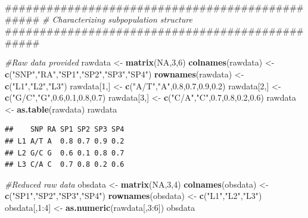 \documentclass[]{article}
\newenvironment{Shaded}{\begin{snugshade}}{\end{snugshade}}
\newcommand{\KeywordTok}[1]{\textcolor[rgb]{0.13,0.29,0.53}{\textbf{{#1}}}}
\newcommand{\DecValTok}[1]{\textcolor[rgb]{0.00,0.00,0.81}{{#1}}}
\newcommand{\FloatTok}[1]{\textcolor[rgb]{0.00,0.00,0.81}{{#1}}}
\newcommand{\StringTok}[1]{\textcolor[rgb]{0.31,0.60,0.02}{{#1}}}
\newcommand{\CommentTok}[1]{\textcolor[rgb]{0.56,0.35,0.01}{\textit{{#1}}}}
\newcommand{\OtherTok}[1]{\textcolor[rgb]{0.56,0.35,0.01}{{#1}}}
\newcommand{\NormalTok}[1]{{#1}}
\begin{document}
\begin{Shaded}
\begin{Highlighting}[]
\NormalTok{################################################}
\CommentTok{# Characterizing subpopulation structure}
\NormalTok{################################################}

\CommentTok{#Raw data provided}
\NormalTok{rawdata <-}\StringTok{ }\KeywordTok{matrix}\NormalTok{(}\OtherTok{NA}\NormalTok{,}\DecValTok{3}\NormalTok{,}\DecValTok{6}\NormalTok{)}
\KeywordTok{colnames}\NormalTok{(rawdata) <-}\StringTok{ }\KeywordTok{c}\NormalTok{(}\StringTok{"SNP"}\NormalTok{,}\StringTok{"RA"}\NormalTok{,}\StringTok{"SP1"}\NormalTok{,}\StringTok{"SP2"}\NormalTok{,}\StringTok{"SP3"}\NormalTok{,}\StringTok{"SP4"}\NormalTok{)}
\KeywordTok{rownames}\NormalTok{(rawdata) <-}\StringTok{ }\KeywordTok{c}\NormalTok{(}\StringTok{"L1"}\NormalTok{,}\StringTok{"L2"}\NormalTok{,}\StringTok{"L3"}\NormalTok{)}
\NormalTok{rawdata[}\DecValTok{1}\NormalTok{,] <-}\StringTok{ }\KeywordTok{c}\NormalTok{(}\StringTok{"A/T"}\NormalTok{,}\StringTok{"A"}\NormalTok{,}\FloatTok{0.8}\NormalTok{,}\FloatTok{0.7}\NormalTok{,}\FloatTok{0.9}\NormalTok{,}\FloatTok{0.2}\NormalTok{)}
\NormalTok{rawdata[}\DecValTok{2}\NormalTok{,] <-}\StringTok{ }\KeywordTok{c}\NormalTok{(}\StringTok{"G/C"}\NormalTok{,}\StringTok{"G"}\NormalTok{,}\FloatTok{0.6}\NormalTok{,}\FloatTok{0.1}\NormalTok{,}\FloatTok{0.8}\NormalTok{,}\FloatTok{0.7}\NormalTok{)}
\NormalTok{rawdata[}\DecValTok{3}\NormalTok{,] <-}\StringTok{ }\KeywordTok{c}\NormalTok{(}\StringTok{"C/A"}\NormalTok{,}\StringTok{"C"}\NormalTok{,}\FloatTok{0.7}\NormalTok{,}\FloatTok{0.8}\NormalTok{,}\FloatTok{0.2}\NormalTok{,}\FloatTok{0.6}\NormalTok{)}
\NormalTok{rawdata <-}\StringTok{ }\KeywordTok{as.table}\NormalTok{(rawdata)}
\NormalTok{rawdata}
\end{Highlighting}
\end{Shaded}

\begin{verbatim}
##    SNP RA SP1 SP2 SP3 SP4
## L1 A/T A  0.8 0.7 0.9 0.2
## L2 G/C G  0.6 0.1 0.8 0.7
## L3 C/A C  0.7 0.8 0.2 0.6
\end{verbatim}

\begin{Shaded}
\begin{Highlighting}[]
\CommentTok{#Reduced raw data}
\NormalTok{obsdata <-}\StringTok{ }\KeywordTok{matrix}\NormalTok{(}\OtherTok{NA}\NormalTok{,}\DecValTok{3}\NormalTok{,}\DecValTok{4}\NormalTok{) }
\KeywordTok{colnames}\NormalTok{(obsdata) <-}\StringTok{ }\KeywordTok{c}\NormalTok{(}\StringTok{"SP1"}\NormalTok{,}\StringTok{"SP2"}\NormalTok{,}\StringTok{"SP3"}\NormalTok{,}\StringTok{"SP4"}\NormalTok{)}
\KeywordTok{rownames}\NormalTok{(obsdata) <-}\StringTok{ }\KeywordTok{c}\NormalTok{(}\StringTok{"L1"}\NormalTok{,}\StringTok{"L2"}\NormalTok{,}\StringTok{"L3"}\NormalTok{)}
\NormalTok{obsdata[,}\DecValTok{1}\NormalTok{:}\DecValTok{4}\NormalTok{] <-}\StringTok{ }\KeywordTok{as.numeric}\NormalTok{(rawdata[,}\DecValTok{3}\NormalTok{:}\DecValTok{6}\NormalTok{])}
\NormalTok{obsdata}
\end{Highlighting}
\end{Shaded}
\end{document}
